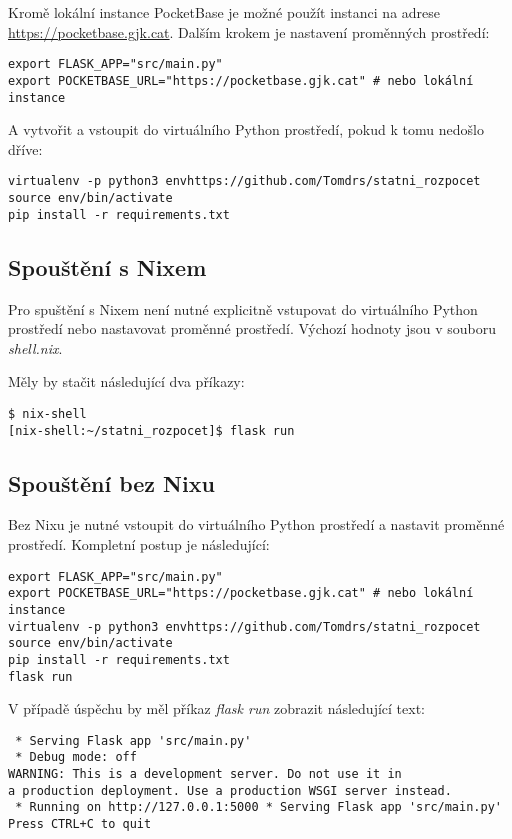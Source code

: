 \documentclass[11pt,a4paper,twoside,openright]{report}
\begin{document}
Kromě lokální instance PocketBase je možné použít instanci na adrese \url{https://pocketbase.gjk.cat}.
Dalším krokem je nastavení proměnných prostředí:

\begin{verbatim}
export FLASK_APP="src/main.py"
export POCKETBASE_URL="https://pocketbase.gjk.cat" # nebo lokální instance
\end{verbatim}

A vytvořit a vstoupit do virtuálního Python prostředí, pokud k tomu nedošlo dříve:

\begin{verbatim}
virtualenv -p python3 envhttps://github.com/Tomdrs/statni_rozpocet
source env/bin/activate
pip install -r requirements.txt
\end{verbatim}

\subsection{Spouštění s Nixem}
Pro spuštění s Nixem není nutné explicitně vstupovat do virtuálního Python prostředí nebo nastavovat proměnné prostředí.
Výchozí hodnoty jsou v souboru \emph{shell.nix}.

Měly by stačit následující dva příkazy:
\begin{verbatim}
$ nix-shell
[nix-shell:~/statni_rozpocet]$ flask run
\end{verbatim}

\subsection{Spouštění bez Nixu}
Bez Nixu je nutné vstoupit do virtuálního Python prostředí a nastavit proměnné prostředí. Kompletní postup je následující:

\begin{verbatim}
export FLASK_APP="src/main.py"
export POCKETBASE_URL="https://pocketbase.gjk.cat" # nebo lokální instance
virtualenv -p python3 envhttps://github.com/Tomdrs/statni_rozpocet
source env/bin/activate
pip install -r requirements.txt
flask run
\end{verbatim}

V případě úspěchu by měl příkaz \emph{flask run} zobrazit následující text:

\begin{verbatim}
 * Serving Flask app 'src/main.py'
 * Debug mode: off
WARNING: This is a development server. Do not use it in
a production deployment. Use a production WSGI server instead.
 * Running on http://127.0.0.1:5000 * Serving Flask app 'src/main.py'
Press CTRL+C to quit
\end{verbatim}
\end{document}

